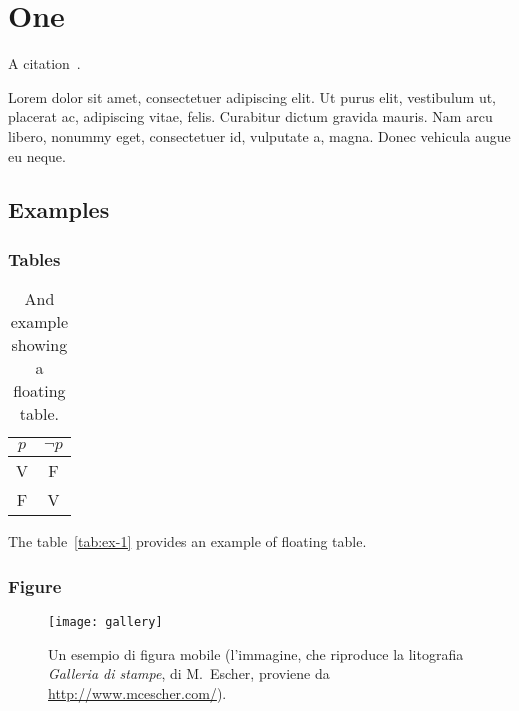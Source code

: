
\chapter{One}
\label{cap:one}

A citation~\citep{gihman1973}.

Lorem  dolor sit amet, consectetuer adipiscing elit. Ut purus elit, vestibulum ut, placerat ac, adipiscing vitae, felis. Curabitur dictum gravida mauris. Nam arcu libero, nonummy eget, consectetuer id, vulputate a, magna. Donec vehicula augue eu neque.

\section{Examples}

\subsection{Tables}

\lipsum

\begin{table}[tb]
\caption[A floating table]{And example showing a floating table.}
\label{tab:ex-1}
\centering
\begin{tabular}{cc}
\toprule
$p$ & $\lnot p$ \\ 
\midrule
V   & F \\ 
F   & V \\
\bottomrule 
\end{tabular}
\end{table}

The table~\vref{tab:ex-1} provides an example of floating table.

\lipsum[1-2]

\subsection{Figure}

\lipsum[2]

\begin{figure}[tb] 
\centering 
\texttt{[image: gallery]} 
\caption[Un esempio di figura mobile]{Un esempio di figura mobile (l'immagine, che riproduce la litografia \emph{Galleria di stampe}, di M.~Escher, proviene da \url{http://www.mcescher.com/}).}
\label{fig:galleria} 
\end{figure}

